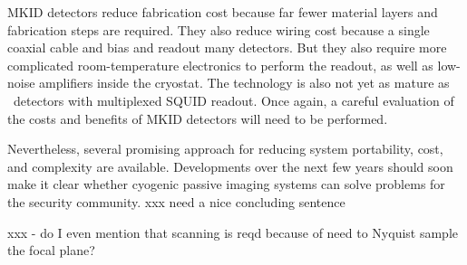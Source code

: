 MKID detectors reduce fabrication cost because far fewer material layers and fabrication steps are required.
They also reduce wiring cost because a single coaxial cable and bias and readout many detectors.
But they also require more complicated room-temperature electronics to perform the readout, as well as low-noise amplifiers inside the cryostat.
The technology is also not yet as mature as \TES\ detectors with multiplexed SQUID readout.
Once again, a careful evaluation of the costs and benefits of MKID detectors will need to be performed.

Nevertheless, several promising approach for reducing system portability, cost, and complexity are available.
Developments over the next few years should soon make it clear whether cyogenic passive imaging systems can solve problems for the security community.
xxx need a nice concluding sentence

xxx - do I even mention that scanning is reqd because of need to Nyquist sample the focal plane? 
